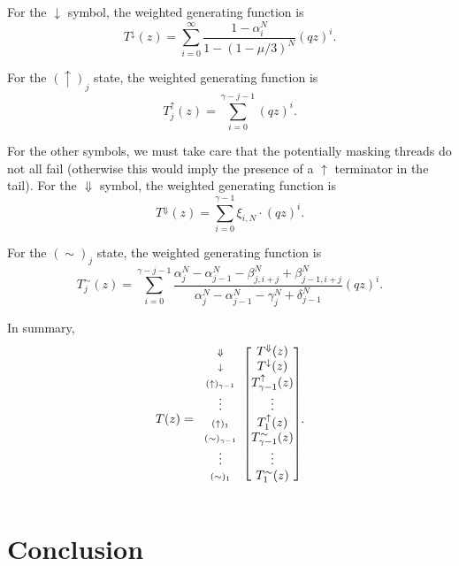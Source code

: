 \documentclass{article}
\newcommand{\DN}{\scriptstyle{\Downarrow}}
\newcommand{\dn}{\scriptstyle{\downarrow}}
\newcommand{\up}[1]{\scriptstyle{(\uparrow)_{#1}}}
\newcommand{\eq}[1]{\scriptstyle{(\sim)_{#1}}}
\begin{document}
For the $\downarrow$ symbol, the weighted generating function is
\begin{equation}
T^\downarrow(z) = \sum_{i=0}^\infty
\frac{1-\alpha_i^N}{1-(1-\mu/3)^N} (qz)^i.
\end{equation}

For the $(\uparrow)_j$ state, the weighted generating function is
\begin{equation}
T^\uparrow_j(z) = \sum_{i=0}^{\gamma-j-1} (qz)^i.
\end{equation}

For the other symbols, we must take care that the potentially masking
threads do not all fail (otherwise this would imply the presence of a
$\uparrow$ terminator in the tail). For the $\Downarrow$ symbol, the
weighted generating function is
\begin{equation}
T^\Downarrow(z) = \sum_{i=0}^{\gamma-1} \xi_{i,N} \cdot (qz)^i.
\end{equation}

For the $(\sim)_j$ state, the weighted generating function is
\begin{equation}
T^\sim_j(z) = \sum_{i=0}^{\gamma-j-1}
\frac{ \alpha_j^N-\alpha_{j-1}^N-\beta_{j,i+j}^N +\beta_{j-1,i+j}^N }
{\alpha_j^N-\alpha_{j-1}^N-\gamma_j^N+\delta_{j-1}^N} (qz)^i.
\end{equation}

In summary,
\begin{equation*}
T(z) = 
\begin{blockarray}{cc}
\begin{block}{c[c]}
\DN & T^\Downarrow(z) \\
\dn & T^\downarrow(z) \\
\up{\gamma-1} & T^\uparrow_{\gamma-1}(z) \\
\vdots & \vdots \\
\up{1} & \; T^\uparrow_1(z) \; \\
\eq{\gamma-1} & T^\sim_{\gamma-1}(z) \\
\vdots & \vdots \\
\eq{1} & T^\sim_1(z) \\
\end{block}
\end{blockarray}.
\end{equation*}


\section{Conclusion}
\end{document}
